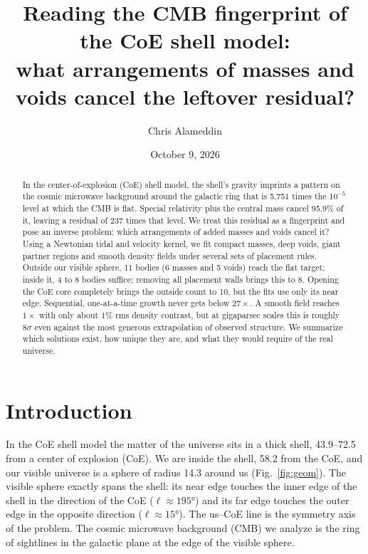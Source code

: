 \documentclass[aps,prd,twocolumn,nofootinbib,superscriptaddress,floatfix]{revtex4-2}
\begin{document}
\title{Reading the CMB fingerprint of the CoE shell model:\\ what arrangements of masses and voids cancel the leftover residual?}
\author{Chris Alameddin}
\date{October 9, 2026}
\begin{abstract}
In the center-of-explosion (CoE) shell model, the shell's gravity imprints a pattern on the cosmic microwave background around the galactic ring that is 5,751 times the $10^{-5}$ level at which the CMB is flat. Special relativity plus the central mass cancel 95.9\% of it, leaving a residual of 237 times that level. We treat this residual as a fingerprint and pose an inverse problem: which arrangements of added masses and voids cancel it? Using a Newtonian tidal and velocity kernel, we fit compact masses, deep voids, giant partner regions and smooth density fields under several sets of placement rules. Outside our visible sphere, 11 bodies (6 masses and 5 voids) reach the flat target; inside it, 4 to 8 bodies suffice; removing all placement walls brings this to 8. Opening the CoE core completely brings the outside count to 10, but the fits use only its near edge. Sequential, one-at-a-time growth never gets below $27\times$. A smooth field reaches $1\times$ with only about 1\% rms density contrast, but at gigaparsec scales this is roughly $8\sigma$ even against the most generous extrapolation of observed structure. We summarize which solutions exist, how unique they are, and what they would require of the real universe.
\end{abstract}
\maketitle

\section{Introduction}
In the CoE shell model the matter of the universe sits in a thick shell, \SIrange{43.9}{72.5}{\Gpc} from a center of explosion (CoE). We are inside the shell, \SI{58.2}{\Gpc} from the CoE, and our visible universe is a sphere of radius \SI{14.3}{\Gpc} around us (Fig.~\ref{fig:geom}). The visible sphere exactly spans the shell: its near edge touches the inner edge of the shell in the direction of the CoE ($\ell\approx\ang{195}$) and its far edge touches the outer edge in the opposite direction ($\ell\approx\ang{15}$). The us--CoE line is the symmetry axis of the problem. The cosmic microwave background (CMB) we analyze is the ring of sightlines in the galactic plane at the edge of the visible sphere.
\end{document}
